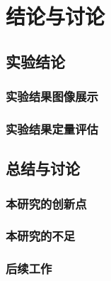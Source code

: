 
\chapter{结论与讨论}
\section{实验结论}
\subsection{实验结果图像展示}
\subsection{实验结果定量评估}
\section{总结与讨论}
\subsection{本研究的创新点}
\subsection{本研究的不足}
\subsection{后续工作}

